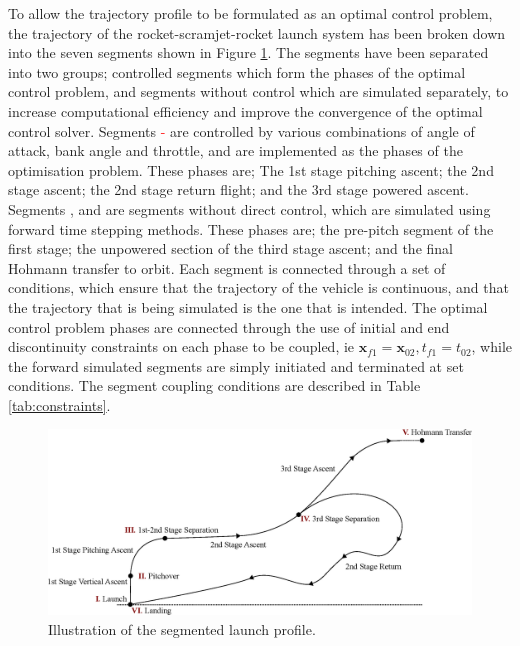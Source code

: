  To allow the trajectory profile to be formulated as an optimal control problem, the trajectory of the rocket-scramjet-rocket launch system has been broken down into the seven segments shown in Figure \ref{fig:Traj}. 
  The segments have been separated into two groups; controlled segments which form the phases of the optimal control problem, and segments without control which are simulated separately, to increase computational efficiency and improve the convergence of the optimal control solver.  
 Segments \textcolor{red}{-} are controlled by various combinations of angle of attack, bank angle and throttle, and are implemented as the phases of the optimisation problem. These phases are; The 1st stage pitching ascent; the 2nd stage ascent; the 2nd stage return flight; and the 3rd stage powered ascent.
 Segments \textcolor{red}{},\textcolor{red}{} and \textcolor{red}{} are segments without direct control, which are simulated using forward time stepping methods. 
 These phases are; the pre-pitch segment of the first stage; the unpowered section of the third stage ascent; and the final Hohmann transfer to orbit. 
 Each segment is connected through a set of conditions, which ensure that the trajectory of the vehicle is continuous, and that the trajectory that is being simulated is the one that is intended. 
  The optimal control problem phases are connected through the use of initial and end discontinuity constraints on each phase to be coupled, ie $\textbf{x}_{f1} = \textbf{x}_{02}, t_{f1} = t_{02}$, while the forward simulated segments are simply initiated and terminated at set conditions. 
 The segment coupling conditions are described in Table \ref{tab:constraints}.


\begin{figure}[ht]
	\centering
	\includegraphics[width=1.\linewidth]{figures/4_LODESTAR/Traj}
	\caption{Illustration of the segmented launch profile.}
	\label{fig:Traj}
\end{figure}



